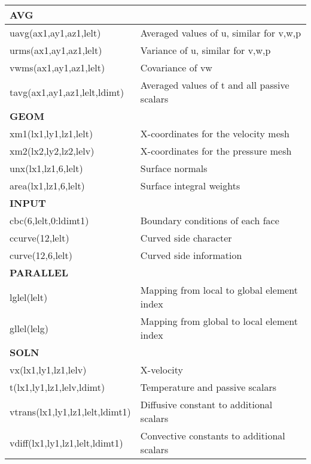 \begin{table}
    \centering
    \begin{tabular}{l l}
        \multicolumn{2}{l}{\textbf{AVG}}\\ \hline
uavg(ax1,ay1,az1,lelt)           & Averaged values of u, similar for v,w,p\\
urms(ax1,ay1,az1,lelt)           & Variance of u, similar for v,w,p\\
vwms(ax1,ay1,az1,lelt)           & Covariance of vw\\
tavg(ax1,ay1,az1,lelt,ldimt)     & Averaged values of t and all passive scalars\\

\multicolumn{2}{l}{\textbf{GEOM}}\\ \hline
xm1(lx1,ly1,lz1,lelt)            & X-coordinates for the velocity mesh \\
xm2(lx2,ly2,lz2,lelv)            & X-coordinates for the pressure mesh\\
unx(lx1,lz1,6,lelt)              & Surface normals \\
area(lx1,lz1,6,lelt)             & Surface integral weights\\

\multicolumn{2}{l}{\textbf{INPUT}}\\ \hline

cbc(6,lelt,0:ldimt1)             & Boundary conditions of each face\\
ccurve(12,lelt)                  & Curved side character \\
curve(12,6,lelt)                 & Curved side information\\

\multicolumn{2}{l}{\textbf{PARALLEL}}\\ \hline
lglel(lelt)                      & 	Mapping from local to global element index\\
gllel(lelg)                      & 	Mapping from global to local element index\\

\multicolumn{2}{l}{\textbf{SOLN}}\\ \hline
vx(lx1,ly1,lz1,lelv)            & X-velocity\\
t(lx1,ly1,lz1,lelv,ldimt)       & Temperature and passive scalars\\
vtrans(lx1,ly1,lz1,lelt,ldimt1) & Diffusive constant to additional scalars\\
vdiff(lx1,ly1,lz1,lelt,ldimt1)  & Convective constants to additional scalars\\


\end{tabular}
\end{table}
